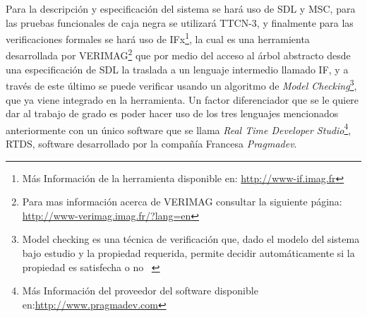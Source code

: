 Para la descripci\'on y especificaci\'on del sistema se har\'a uso de SDL y 
MSC, para las pruebas funcionales de caja negra se utilizar\'a TTCN-3, y 
finalmente para las verificaciones formales se har\'a uso de IFx\footnote{M\'as 
Informaci\'on de la herramienta disponible en: \url{http://www-if.imag.fr}}, la cual es una 
herramienta desarrollada por VERIMAG\footnote{Para mas informaci\'on acerca de VERIMAG consultar la siguiente p\'agina: \url{http://www-verimag.imag.fr/?lang=en}} que por medio del acceso al \'arbol 
abstracto desde una especificaci\'on de SDL la traslada a un lenguaje intermedio 
llamado IF,  y a trav\'es de este \'ultimo se puede verificar usando un 
algoritmo de \textit{Model Checking}\footnote{Model checking es una t\'ecnica 
de verificaci\'on que, dado el modelo del sistema bajo estudio y la propiedad 
requerida, permite decidir autom\'aticamente si la propiedad es satisfecha o no 
~\cite{Clarke1996,Hames2009}}, que ya viene 
integrado en la herramienta. Un factor diferenciador que se le quiere dar al 
trabajo de grado es poder hacer uso de los tres lenguajes mencionados 
anteriormente con un \'unico software que se llama \textit{Real Time Developer 
Studio}\footnote{M\'as Informaci\'on del proveedor del 
software disponible en:\url{http://www.pragmadev.com}}, RTDS, software desarrollado por la 
compa\~n\'ia Francesa \textit{Pragmadev}.

